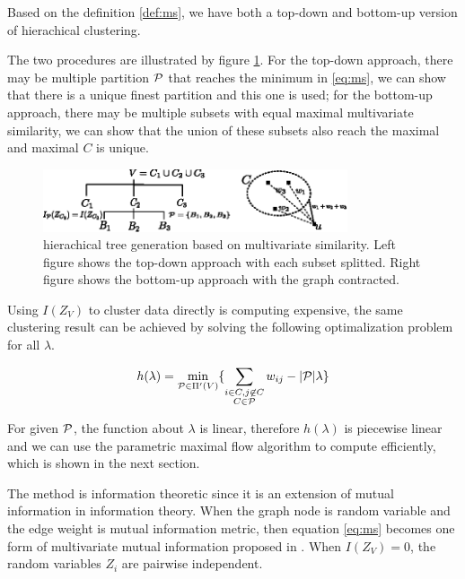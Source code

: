 \documentclass{article}
\begin{document}
Based on the definition \eqref{def:ms}, we have both a top-down and bottom-up version of hierachical clustering.

The two procedures are illustrated by figure \ref{fig:ta}. For the top-down approach, there may be multiple partition $\P$ that reaches the minimum in \eqref{eq:ms}, we can show that there is a unique finest partition and this one is used; for the bottom-up approach, there may be multiple subsets with equal maximal multivariate similarity, we can show that the union of these subsets also reach the maximal and maximal $C$ is unique.
\begin{figure}
\centering
\includegraphics[width=0.8\textwidth]{two_approach.eps}
\caption{hierachical tree generation based on multivariate similarity. Left figure shows the top-down approach with each subset splitted. Right figure shows the bottom-up approach with the graph contracted.}\label{fig:ta}
\end{figure}

Using $I(Z_V)$ to cluster data directly is computing expensive, the same clustering result can be achieved by solving the following optimalization problem for all $\lambda$.
\begin{proposition}
\begin{equation}\label{eq:hL}
h(\lambda) = \min_{\P \in \Pi'(V)}\{ \sum_{\substack{i\in C, j \not\in C\\ C\in \mathcal{P}}}w_{ij} - \abs{\P} \lambda \}
\end{equation}
\end{proposition}

For given $\P$, the function about $\lambda$ is linear, therefore $h(\lambda)$ is piecewise linear and we can use the parametric maximal flow algorithm to compute efficiently, which is shown in the next section.

The method is information theoretic since it is an extension of mutual information in information theory. When the graph node is random variable and the edge weight is mutual information metric, then equation \eqref{eq:ms} becomes one form of multivariate mutual information proposed in \cite{RN1}. When $I(Z_V)=0$, the random variables $Z_i$ are pairwise independent. 
\end{document}
